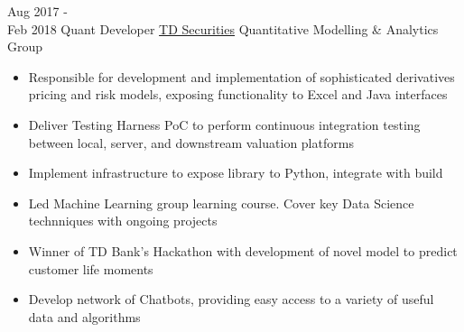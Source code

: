 \documentclass[letterpaper]{twentysecondcv} %
\begin{document}
\begin{twenty}
	\twentyitem
    	{Aug 2017 - \\ Feb 2018}
        {Quant Developer}
        {\href{https://www.tdsecurities.com}{TD Securities}}
        {Quantitative Modelling \& Analytics Group}
        {
        \item{}
        \item{}
        \item
        \item{}
        \item{}
        \item{}
        \item{}
		\item{}
		\item{}
		}
        {\begin{itemize}
        \item Responsible for development and implementation of sophisticated derivatives pricing and risk models, exposing functionality to Excel and Java interfaces
        \item Deliver Testing Harness PoC to perform continuous integration testing between local, server, and downstream valuation platforms
        \item Implement infrastructure to expose library to Python, integrate with build
        \item Led Machine Learning group learning course. Cover key Data Science technniques with ongoing projects
        \item Winner of TD Bank's Hackathon with development of novel model to predict customer life moments
        \item Develop network of Chatbots, providing easy access to a variety of useful data and algorithms
    \end{itemize}	
    	}


\end{twenty}
\end{document}
